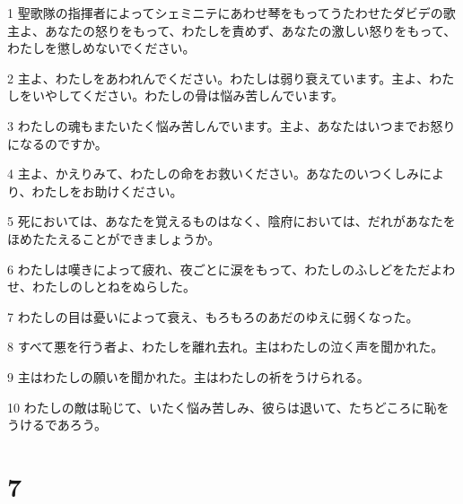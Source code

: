 \par 1 聖歌隊の指揮者によってシェミニテにあわせ琴をもってうたわせたダビデの歌 主よ、あなたの怒りをもって、わたしを責めず、あなたの激しい怒りをもって、わたしを懲しめないでください。
\par 2 主よ、わたしをあわれんでください。わたしは弱り衰えています。主よ、わたしをいやしてください。わたしの骨は悩み苦しんでいます。
\par 3 わたしの魂もまたいたく悩み苦しんでいます。主よ、あなたはいつまでお怒りになるのですか。
\par 4 主よ、かえりみて、わたしの命をお救いください。あなたのいつくしみにより、わたしをお助けください。
\par 5 死においては、あなたを覚えるものはなく、陰府においては、だれがあなたをほめたたえることができましょうか。
\par 6 わたしは嘆きによって疲れ、夜ごとに涙をもって、わたしのふしどをただよわせ、わたしのしとねをぬらした。
\par 7 わたしの目は憂いによって衰え、もろもろのあだのゆえに弱くなった。
\par 8 すべて悪を行う者よ、わたしを離れ去れ。主はわたしの泣く声を聞かれた。
\par 9 主はわたしの願いを聞かれた。主はわたしの祈をうけられる。
\par 10 わたしの敵は恥じて、いたく悩み苦しみ、彼らは退いて、たちどころに恥をうけるであろう。

\chapter{7}

